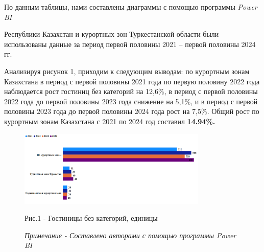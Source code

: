 
\begin{multicols}{2}
По данным таблицы, нами составлены диаграммы с помощью программы
\emph{Power BI}

Республики Казахстан и курортных зон Туркестанской области были
использованы данные за период первой половины 2021 -- первой половины
2024 гг.

Анализируя рисунок 1, приходим к следующим выводам: по курортным зонам
Казахстана в период с первой половины 2021 года по первую половину 2022
года наблюдается рост гостиниц без категорий на 12,6\%, в период с
первой половины 2022 года до первой половины 2023 года снижение на
5,1\%, и в период с первой половины 2023 года до первой половины 2024
года рост на 7,5\%. Общий рост по курортным зонам Казахстана с 2021 по
2024 год составил {\bfseries 14.94\%.}
\end{multicols}

\begin{figure}[H]
	\centering
	\includegraphics[width=0.8\textwidth]{media/ekon/image3}
	\caption*{Рис.1 - Гостиницы без категорий, единицы}
	\caption*{\emph{Примечание - Составлено авторами с помощью программы Power BI}}
\end{figure}

